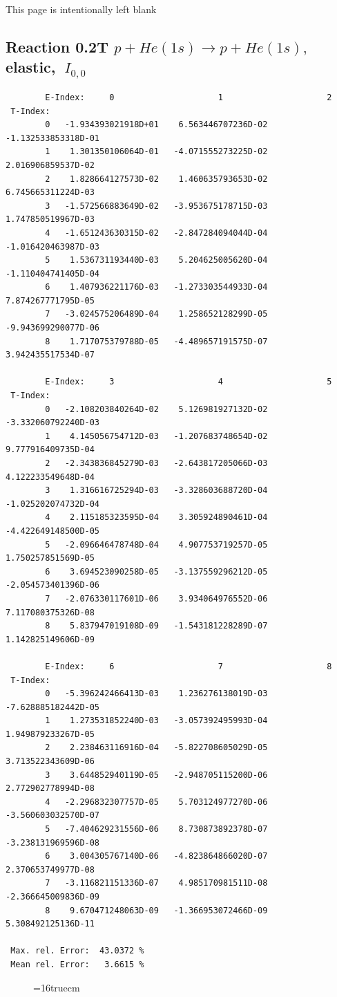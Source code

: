 \documentclass[12pt,dvips]{article}
\begin{document}
\newpage
This page is intentionally left blank
\newpage

\subsection{
Reaction 0.2T $ p + He(1s) \rightarrow p + He(1s) ,\  $
elastic, $ \  I_{0,0} $
}

\begin{small}\begin{verbatim}
        E-Index:     0                     1                     2
 T-Index:
        0   -1.934393021918D+01    6.563446707236D-02   -1.132533853318D-01
        1    1.301350106064D-01   -4.071555273225D-02    2.016906859537D-02
        2    1.828664127573D-02    1.460635793653D-02    6.745665311224D-03
        3   -1.572566883649D-02   -3.953675178715D-03    1.747850519967D-03
        4   -1.651243630315D-02   -2.847284094044D-04   -1.016420463987D-03
        5    1.536731193440D-03    5.204625005620D-04   -1.110404741405D-04
        6    1.407936221176D-03   -1.273303544933D-04    7.874267771795D-05
        7   -3.024575206489D-04    1.258652128299D-05   -9.943699290077D-06
        8    1.717075379788D-05   -4.489657191575D-07    3.942435517534D-07

        E-Index:     3                     4                     5
 T-Index:
        0   -2.108203840264D-02    5.126981927132D-02   -3.332060792240D-03
        1    4.145056754712D-03   -1.207683748654D-02    9.777916409735D-04
        2   -2.343836845279D-03   -2.643817205066D-03    4.122233549648D-04
        3    1.316616725294D-03   -3.328603688720D-04   -1.025202074732D-04
        4    2.115185323595D-04    3.305924890461D-04   -4.422649148500D-05
        5   -2.096646478748D-04    4.907753719257D-05    1.750257851569D-05
        6    3.694523090258D-05   -3.137559296212D-05   -2.054573401396D-06
        7   -2.076330117601D-06    3.934064976552D-06    7.117080375326D-08
        8    5.837947019108D-09   -1.543181228289D-07    1.142825149606D-09

        E-Index:     6                     7                     8
 T-Index:
        0   -5.396242466413D-03    1.236276138019D-03   -7.628885182442D-05
        1    1.273531852240D-03   -3.057392495993D-04    1.949879233267D-05
        2    2.238463116916D-04   -5.822708605029D-05    3.713522343609D-06
        3    3.644852940119D-05   -2.948705115200D-06    2.772902778994D-08
        4   -2.296832307757D-05    5.703124977270D-06   -3.560603032570D-07
        5   -7.404629231556D-06    8.730873892378D-07   -3.238131969596D-08
        6    3.004305767140D-06   -4.823864866020D-07    2.370653749977D-08
        7   -3.116821151336D-07    4.985170981511D-08   -2.366645009836D-09
        8    9.670471248063D-09   -1.366953072466D-09    5.308492125136D-11

 Max. rel. Error:  43.0372 %
 Mean rel. Error:   3.6615 %

\end{verbatim}\end{small}
\begin{figure} \label{0.2T}
\epsfxsize=16truecm
\end{figure}
\newpage
\end{document}
